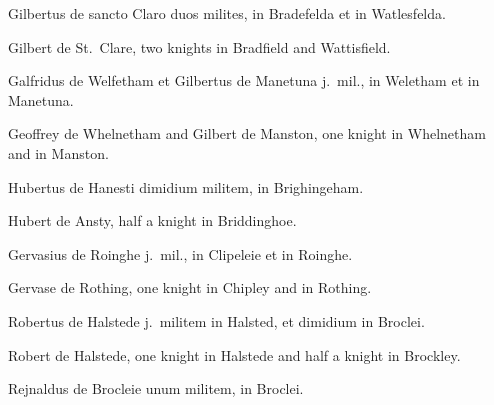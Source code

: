 \documentclass{book}
\begin{document}
\begin{paracol}{2}
\switchcolumn*

\begin{otherlanguage}{latin}
Gilbertus de sancto Claro duos milites, in Bradefelda et in Watlesfelda.
\end{otherlanguage}

\switchcolumn

Gilbert de St.\ Clare, two knights in Bradfield and Wattisfield.

\switchcolumn*

\begin{otherlanguage}{latin}
Galfridus de Welfetham et Gilbertus de Manetuna j.\ mil., in Weletham et in Manetuna.
\end{otherlanguage}

\switchcolumn

Geoffrey de Whelnetham and Gilbert de Manston, one knight in Whelnetham and in Manston.

\switchcolumn*

\begin{otherlanguage}{latin}
Hubertus de Hanesti dimidium militem, in Brighingeham.
\end{otherlanguage}

\switchcolumn

Hubert de Ansty, half a knight in Briddinghoe.

\switchcolumn*

\begin{otherlanguage}{latin}
Gervasius de Roinghe j.\ mil., in Clipeleie et in Roinghe.
\end{otherlanguage}

\switchcolumn

Gervase de Rothing, one knight in Chipley and in Rothing.

\switchcolumn*

\begin{otherlanguage}{latin}
Robertus de Halstede j.\ militem in Halsted, et dimidium in Broclei.
\end{otherlanguage}

\switchcolumn

Robert de Halstede, one knight in Halstede and half a knight in Brockley.

\switchcolumn*

\begin{otherlanguage}{latin}
Rejnaldus de Brocleie unum militem, in Broclei.
\end{otherlanguage}

\switchcolumn


\end{paracol}
\end{document}
